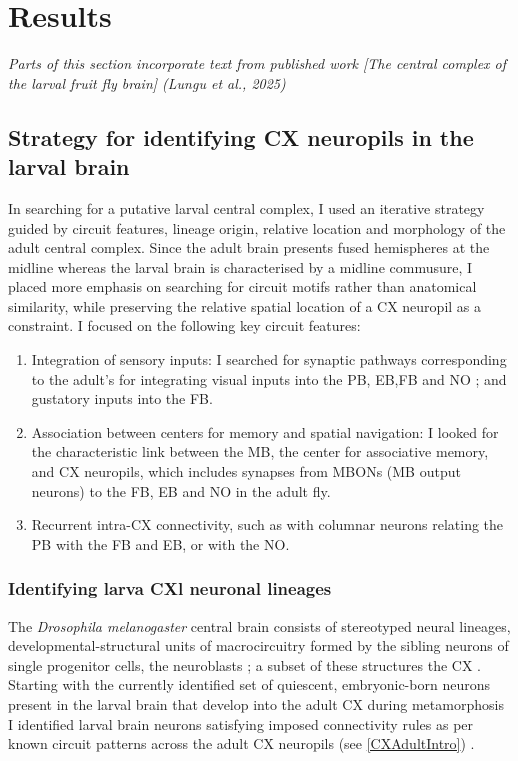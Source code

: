 
\chapter{Results}
\textit{Parts of this section incorporate text from published work [The central complex of the larval fruit fly brain] (Lungu et al., 2025)}


\section{Strategy for identifying CX neuropils in the larval brain}

    In searching for a putative larval central complex, I used an iterative strategy guided by circuit features, lineage origin, relative location and morphology of the adult central complex. Since the adult brain presents fused hemispheres at the midline whereas the larval brain is characterised by a midline commusure, I placed more emphasis on searching for circuit motifs rather than anatomical similarity,  while preserving the relative spatial location of a CX neuropil as a constraint.  I focused on the following key circuit features:
    \begin{enumerate}
    \item Integration of sensory inputs: I searched for synaptic pathways corresponding to the adult's for integrating visual inputs into the PB, EB,FB and NO \citep{hulse2021connectome}; and gustatory inputs into the FB.
    \item Association between centers for memory and spatial navigation: I looked for the characteristic link between the MB, the center for associative memory, and CX neuropils, which includes synapses from MBONs (MB output neurons) to the FB, EB and NO in the adult fly.
    \item Recurrent intra-CX connectivity, such as with columnar neurons relating the PB with the FB and EB, or with the NO.
    \end{enumerate}
    
    \subsection{Identifying larva CXl neuronal lineages }
    The \textit{Drosophila melanogaster} central brain consists of stereotyped neural lineages, developmental-structural units of macrocircuitry formed by the sibling neurons of single progenitor cells, the neuroblasts \citep{Spindler2010Lineages}; a subset of these structures the CX \citep{Pereanu2011LineagesCX}. Starting with the currently identified set of quiescent, embryonic-born neurons present in the larval brain that develop into the adult CX during metamorphosis~\citep{andrade2019developmentally}
    I identified larval brain neurons satisfying imposed connectivity rules as per known circuit patterns across the adult CX neuropils \citep{wolff2015neuroarchitecture, wolff2018neuroarchitecture, franconville2018building, hulse2021connectome} (see \ref{CXAdultIntro}) .
    
